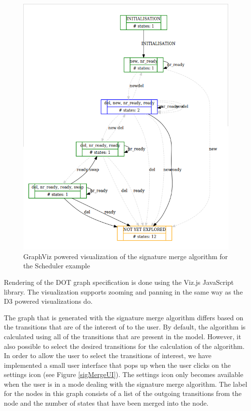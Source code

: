 \begin{center}
\begin{figure}[h!]
\centering
\includegraphics[width=14cm]{bilder/dotty-sigmerge.png}
\caption{GraphViz powered visualization of the signature merge algorithm for the Scheduler example}
\label{sigmergeDotty}
\end{figure}
\end{center}

Rendering of the DOT graph specification is done using the Viz.js JavaScript library. The visualization supports zooming and panning in the same way as the D3 powered visualizations do.

The graph that is generated with the signature merge algorithm differs based on the transitions that are of the interest of to the user. By default, the algorithm is calculated using all of the transitions that are present in the model. However, it also possible to select the desired transitions for the calculation of the algorithm. In order to allow the user to select the transitions of interest, we have implemented a small user interface that pops up when the user clicks on the settings icon (see Figure \ref{sigMergeUI}). The settings icon only becomes available when the user is in a mode dealing with the signature merge algorithm. The label for the nodes in this graph consists of a list of the outgoing transitions from the node and the number of states that have been merged into the node.  

